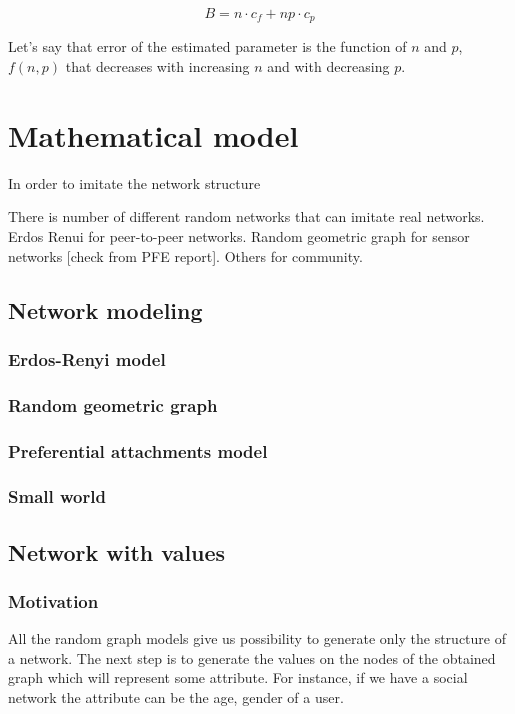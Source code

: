 \documentclass[12pt]{report}
\begin{document}
$$B = n \cdot c_f + np \cdot c_p$$

Let's say that error of the estimated parameter is the function of $n$ and $p$, $f(n,p)$ that decreases with increasing $n$ and with decreasing $p$.

\chapter{Mathematical model}

In order to imitate the network structure 


There is number of different random networks that can imitate real networks. Erdos Renui for peer-to-peer networks. Random geometric graph for sensor networks [check from PFE report]. Others for community.
\section{Network modeling}

\subsection{Erdos-Renyi model}

\subsection{Random geometric graph}

\subsection{Preferential attachments model}

\subsection{Small world}

\section{Network with values}

\subsection{Motivation}

All the random graph models give us possibility to generate only the structure of a network. The next step is to generate the values on the nodes of the obtained graph which will represent some attribute. For instance, if we have a social network the attribute can be the age, gender of a user.  
\end{document}
